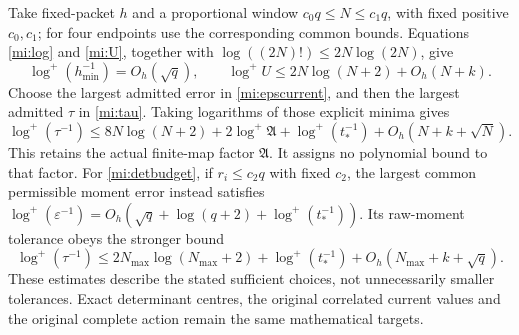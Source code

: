 \documentclass[11pt]{article}
\begin{document}
Take fixed-packet $h$ and a proportional window
$c_0q\le N\le c_1q$, with fixed positive $c_0,c_1$;
for four endpoints use the corresponding common bounds.
Equations \eqref{mi:log} and \eqref{mi:U}, together with
$\log((2N)!)\le2N\log(2N)$, give
\[
 \log^+(h_{\min}^{-1})=O_h(\sqrt q),\qquad
 \log^+U\le2N\log(N+2)+O_h(N+k).
\]
Choose the largest admitted error in \eqref{mi:epscurrent}, and
then the largest admitted $\tau$ in \eqref{mi:tau}. Taking
logarithms of those explicit minima gives
\begin{equation}\tag{MI24}\label{mi:currentcost}
 \log^+(\tau^{-1})
 \le8N\log(N+2)+2\log^+\mathfrak A+\log^+(t_*^{-1})
       +O_h(N+k+\sqrt N).
\end{equation}
This retains the actual finite-map factor $\mathfrak A$.
It assigns no polynomial bound to that factor.
For \eqref{mi:detbudget}, if $r_i\le c_2q$ with fixed $c_2$,
the largest common permissible moment error instead satisfies
$\log^+(\varepsilon^{-1})
=O_h(\sqrt q+\log(q+2)+\log^+(t_*^{-1}))$.
Its raw-moment tolerance obeys the stronger bound
\begin{equation}\tag{MI25}\label{mi:detcost}
 \log^+(\tau^{-1})
 \le2N_{\max}\log(N_{\max}+2)+\log^+(t_*^{-1})
       +O_h(N_{\max}+k+\sqrt q).
\end{equation}
These estimates describe the stated sufficient choices, not
unnecessarily smaller tolerances. Exact determinant centres,
the original correlated current values and the original complete
action remain the same mathematical targets.
\end{document}
